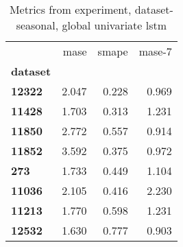 \begin{table}[h]
\centering
\caption{Metrics from experiment, dataset-seasonal, global univariate lstm}
\label{table:global-univariate-lstm-dataset-seasonal}
\begin{tabular}{lrrr}
\toprule
{} &   mase &  smape &  mase-7 \\
\textbf{dataset} &        &        &         \\
\midrule
\textbf{12322  } &  2.047 &  0.228 &   0.969 \\
\textbf{11428  } &  1.703 &  0.313 &   1.231 \\
\textbf{11850  } &  2.772 &  0.557 &   0.914 \\
\textbf{11852  } &  3.592 &  0.375 &   0.972 \\
\textbf{273    } &  1.733 &  0.449 &   1.104 \\
\textbf{11036  } &  2.105 &  0.416 &   2.230 \\
\textbf{11213  } &  1.770 &  0.598 &   1.231 \\
\textbf{12532  } &  1.630 &  0.777 &   0.903 \\
\bottomrule
\end{tabular}
\end{table}
